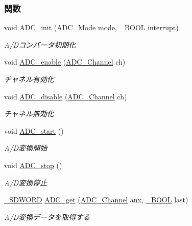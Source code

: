 \subsubsection*{関数}
\begin{DoxyCompactItemize}
\item 
void \hyperlink{adc_8h_ade9427cdb56898519822987924abac56_ade9427cdb56898519822987924abac56}{A\+D\+C\+\_\+init} (\hyperlink{adc_8h_a184c6673e1a242cded56d57b9600e591_a184c6673e1a242cded56d57b9600e591}{A\+D\+C\+\_\+\+Mode} mode, \hyperlink{stddef_8h_afbf708854fe02af8475a9ba02f3196cb_afbf708854fe02af8475a9ba02f3196cb}{\+\_\+\+B\+O\+O\+L} interrupt)
\begin{DoxyCompactList}\small\item\em A/\+Dコンバータ初期化 \end{DoxyCompactList}\item 
void \hyperlink{adc_8h_a57fd0ce331f38600a2db2ffbba308372_a57fd0ce331f38600a2db2ffbba308372}{A\+D\+C\+\_\+enable} (\hyperlink{adc_8h_ad7b9fa1ae8a65e534cce7d26fa0984f6_ad7b9fa1ae8a65e534cce7d26fa0984f6}{A\+D\+C\+\_\+\+Channel} ch)
\begin{DoxyCompactList}\small\item\em チャネル有効化 \end{DoxyCompactList}\item 
void \hyperlink{adc_8h_ae2f308dccaf207cc9242332c7671029d_ae2f308dccaf207cc9242332c7671029d}{A\+D\+C\+\_\+disable} (\hyperlink{adc_8h_ad7b9fa1ae8a65e534cce7d26fa0984f6_ad7b9fa1ae8a65e534cce7d26fa0984f6}{A\+D\+C\+\_\+\+Channel} ch)
\begin{DoxyCompactList}\small\item\em チャネル無効化 \end{DoxyCompactList}\item 
void \hyperlink{adc_8h_a32572a51eecfb3116590f3093fb16300_a32572a51eecfb3116590f3093fb16300}{A\+D\+C\+\_\+start} ()
\begin{DoxyCompactList}\small\item\em A/\+D変換開始 \end{DoxyCompactList}\item 
void \hyperlink{adc_8h_a9bf6b42d8730704dd47b5a025e6b419a_a9bf6b42d8730704dd47b5a025e6b419a}{A\+D\+C\+\_\+stop} ()
\begin{DoxyCompactList}\small\item\em A/\+D変換停止 \end{DoxyCompactList}\item 
\hyperlink{stddef_8h_a931e4fd9bf350284fc21e94cd5ee126f_a931e4fd9bf350284fc21e94cd5ee126f}{\+\_\+\+S\+D\+W\+O\+R\+D} \hyperlink{adc_8h_a47c7c4daf8f782717d6ae97bc0054aa3_a47c7c4daf8f782717d6ae97bc0054aa3}{A\+D\+C\+\_\+get} (\hyperlink{adc_8h_ad7b9fa1ae8a65e534cce7d26fa0984f6_ad7b9fa1ae8a65e534cce7d26fa0984f6}{A\+D\+C\+\_\+\+Channel} anx, \hyperlink{stddef_8h_afbf708854fe02af8475a9ba02f3196cb_afbf708854fe02af8475a9ba02f3196cb}{\+\_\+\+B\+O\+O\+L} last)
\begin{DoxyCompactList}\small\item\em A/\+D変換データを取得する \end{DoxyCompactList}\end{DoxyCompactItemize}


